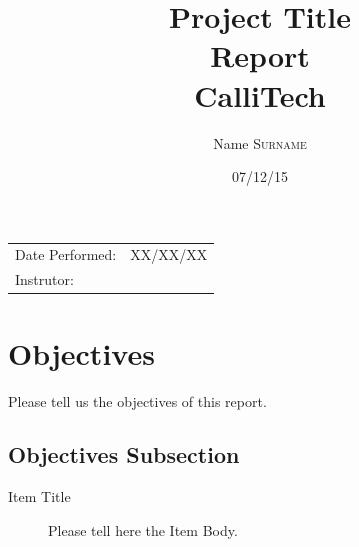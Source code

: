 \documentclass{article}
\title{Project Title \\ Report \\ CalliTech} %
\author{Name \textsc{Surname}} %
\date{07/12/15} %
\begin{document}
\maketitle %

\begin{center}
\begin{tabular}{l r}
Date Performed: & XX/XX/XX \\ %
Instrutor: &  %
\end{tabular}
\end{center}



\section{Objectives}

Please tell us the objectives of this report.


\subsection{Objectives Subsection}
\label{definitions}
\begin{description}
\item[Item Title]
Please tell here the Item Body.
\end{description} 
 
\end{document}
